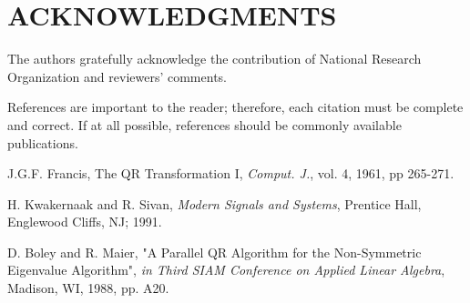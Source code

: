 \documentclass[a4paper, 10pt, conference]{ieeeconf}      %
\begin{document}
\section{ACKNOWLEDGMENTS}

The authors gratefully acknowledge the contribution of National Research Organization and reviewers' comments.



References are important to the reader; therefore, each citation must be complete and correct. If at all possible, references should be commonly available publications.

\begin{thebibliography}{99}

J.G.F. Francis, The QR Transformation I, {\it Comput. J.}, vol. 4, 1961, pp 265-271.

H. Kwakernaak and R. Sivan, {\it Modern Signals and Systems}, Prentice Hall, Englewood Cliffs, NJ; 1991.

D. Boley and R. Maier, "A Parallel QR Algorithm for the Non-Symmetric Eigenvalue Algorithm", {\it in Third SIAM Conference on Applied Linear Algebra}, Madison, WI, 1988, pp. A20.

\end{thebibliography}
\end{document}
